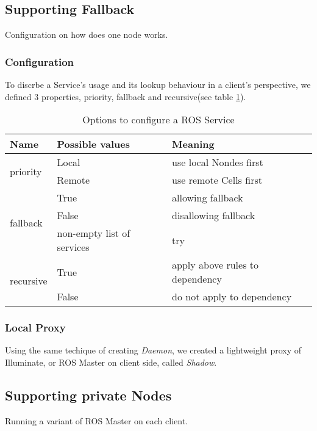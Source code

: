 \subsection{Supporting Fallback}
Configuration on how does one node works. 

\subsubsection{Configuration}
To discrbe a Service's usage and its lookup behaviour in a client's perspective, we defined 3 properties, priority, fallback and recursive(see table \ref{table:srv-opt}).

\begin{table}
    \renewcommand{\arraystretch}{1.3}
    \caption{Options to configure a ROS Service}
    \label{table:srv-opt}
    \centering
    \begin{tabular}{|l|l|l|}
        \hline
        \bfseries Name & \bfseries Possible values & \bfseries Meaning \\
        \hline
        \multirow{2}{*}{priority}  & Local  & use local Nondes first \\
        \cline{2-3}
                                   & Remote & use remote Cells first \\
        \hline
        \multirow{3}{*}{fallback}  & True   & allowing fallback \\
        \cline{2-3}
                                   & False  & disallowing fallback \\
        \cline{2-3}
                                   & non-empty list of services & try  \\
        \hline
        \multirow{2}{*}{recursive} & True   & apply above rules to dependency \\
        \cline{2-3}
                                   & False  & do not apply to dependency \\
        \hline
    \end{tabular}
\end{table} 

\subsubsection{Local Proxy}
Using the same techique of creating \emph{Daemon}, we created a lightweight proxy of Illuminate, or ROS Master on client side, called \emph{Shadow}.

\subsection{Supporting private Nodes}
Running a variant of ROS Master on each client.


